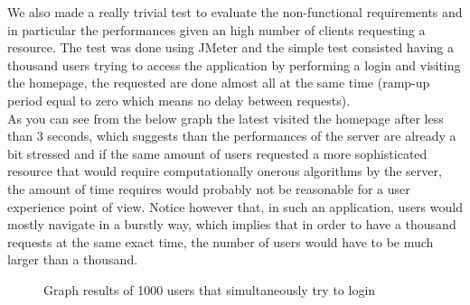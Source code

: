 We also made a really trivial test to evaluate the non-functional requirements and in particular the performances given an high number of clients requesting a resource. The test was done using JMeter and the simple test consisted having a thousand users trying to access the application by performing a login and visiting the homepage, the requested are done almost all at the same time (ramp-up period equal to zero which means no delay between requests).
\\As you can see from the below graph the latest visited the homepage after less than 3 seconds, which suggests than the performances of the server are already a bit stressed and if the same amount of users requested a more sophisticated resource that would require computationally onerous algorithms by the server, the amount of time requires would probably not be reasonable for a user experience point of view. Notice however that, in such an application, users would mostly navigate in a burstly way, which implies that in order to have a thousand requests at the same exact time, the number of users would have to be much larger than a thousand.
\begin{figure} 
\begin{center}

\caption{Graph results of 1000 users that simultaneously try to login} 
\label{fig:jmetertest} 


\end{center}
\end{figure} 


